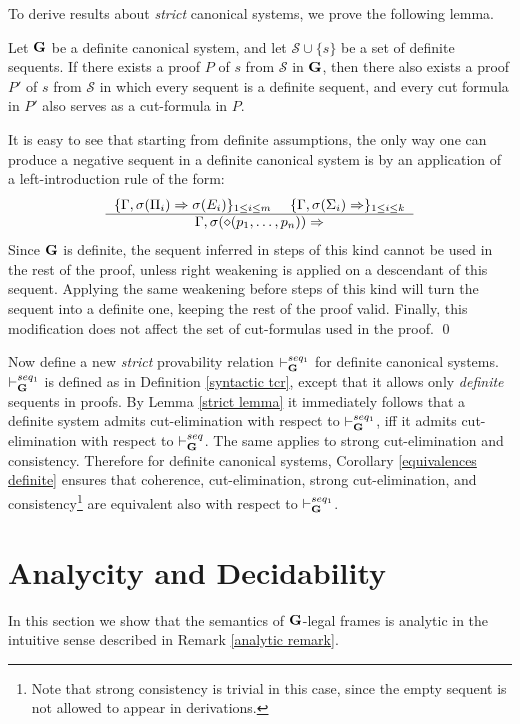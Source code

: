 \documentclass{LMCS}
\theoremstyle{remark}
\newcommand{\Ss}{\mathcal{S}}
\newcommand{\G}{{\bf G}}
\newcommand{\dd}{\diamond}
\newcommand{\ptil}{p_1 \til p_n}
\newcommand{\Ra}{\Rightarrow}
\newcommand{\g}{\Gamma}
\newcommand{\vd}{\vdash}
\newcommand{\derb}[3]{
    \begin{tabular}{c}
    $ #1 \ \ \ \ #2 $ \\ \hline
    $ #3 $ \\
    \end{tabular}}
\begin{document}
\begin{enumerate}[(a)]
\begin{enumerate}[\bf(a):]
To derive results about {\em strict} canonical systems, we prove the following lemma.

\begin{lem}
\label{strict lemma}
Let ${\G}$ be a definite canonical system,
and let $\Ss \cup \{s\}$ be a set of definite sequents.
If there exists a proof $P$ of $s$ from $\Ss$ in $\G$,
then there also exists a proof $P'$ of $s$ from $\Ss$ 
in which every sequent is a definite sequent,
and every cut formula in $P'$ also serves as a cut-formula in $P$.
\end{lem}
\proof
It is easy to see that starting from definite assumptions,
the only way one can produce a negative sequent in a definite canonical system 
is by an application of a left-introduction rule of the form:
\[\derb{\{\g,\sigma(\Pi_i) \Ra \sigma(E_i)\}_{1 \leq i \leq m}}
 {\{\g,\sigma(\Sigma_i) \Ra \}_{1 \leq i \leq k}}
 {\g, \sigma(\dd(\ptil))\Ra}\]
Since $\G$ is definite, the sequent inferred in steps of this kind
cannot be used in the rest of the proof, unless right weakening is applied on a descendant of this sequent.
Applying the same weakening before steps of this kind will turn 
the sequent into a definite one, keeping the rest of the proof valid.
Finally, this modification does not affect the set of cut-formulas used in the proof.
\qed

Now define a new {\em strict} provability relation $\vd_{\G}^{seq_1}$ for definite canonical systems.
$\vd_{\G}^{seq_1}$ is defined as in Definition \ref{syntactic tcr}, except that
it  allows only {\em definite} sequents in proofs.
By Lemma \ref{strict lemma} it immediately follows 
that a definite system admits cut-elimination with respect to $\vd_{\G}^{seq_1}$, 
iff it admits cut-elimination with respect to $\vd_{\G}^{seq}$.
The same applies to strong cut-elimination and consistency.
Therefore for definite canonical systems,
Corollary \ref{equivalences definite} ensures that
coherence, cut-elimination, strong cut-elimination, and consistency\footnote{Note that strong consistency
is trivial in this case, since the empty sequent is not allowed to appear in derivations.}
are equivalent also with respect to $\vd_{\G}^{seq_1}$.

\section{Analycity and Decidability}

In this section we show that the 
semantics of ${\G}$-legal frames is analytic in the intuitive sense described 
in Remark \ref{analytic remark}.




\end{enumerate}
\end{enumerate}
\end{document}
